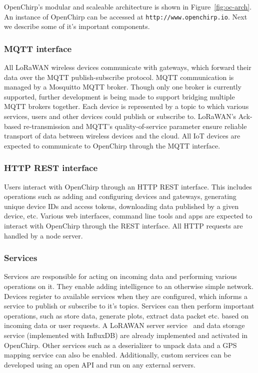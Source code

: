 \documentclass[conference]{IEEEtran}
\newcommand{\figref}[1]{Figure~\ref{fig:#1}}
\begin{document}
OpenChirp's modular and scaleable architecture is shown in \figref{oc-arch}.
An instance of OpenChirp can be accessed at \texttt{http://www.openchirp.io}.
Next we describe some of it's important components.


\subsubsection{MQTT interface}
All LoRaWAN wireless devices communicate with gateways, which forward their
data over the MQTT publish-subscribe protocol. MQTT communication is managed
by a Mosquitto MQTT broker. Though only one broker is currently supported,
further development is being made to support bridging multiple MQTT brokers
together. Each device is represented by a topic to which various services,
users and other devices could publish or subscribe to. LoRaWAN's Ack-based
re-transmission and MQTT's quality-of-service parameter ensure reliable
transport of data between wireless devices and the cloud. All IoT devices are
expected to communicate to OpenChirp through the MQTT interface.

\subsubsection{HTTP REST interface}

Users interact with OpenChirp through an HTTP REST interface. This
includes operations such as adding and configuring devices and
gateways, generating unique device IDs and access tokens, downloading data
published by a given device, etc. Various web interfaces, command line tools
and apps are expected to interact with OpenChirp through the REST interface.
All HTTP requests are handled by a node server.

\subsubsection{Services}

Services are responsible for acting on incoming data and performing various
operations on it. They enable adding intelligence to an otherwise simple
network. Devices register to available services when they are configured,
which informs a service to publish or subscribe to it's topics. Services can
then perform important operations, such as store data, generate plots, extract data packet etc. based on incoming data or user requests. A LoRAWAN server
service~\cite{loraserver} and data storage service (implemented with InfluxDB)
are already implemented and activated in OpenChirp. Other services such as a
deserializer to unpack data and a GPS mapping service can also be enabled.
Additionally, custom services can be developed using an open API and run on
any external servers.
\end{document}
